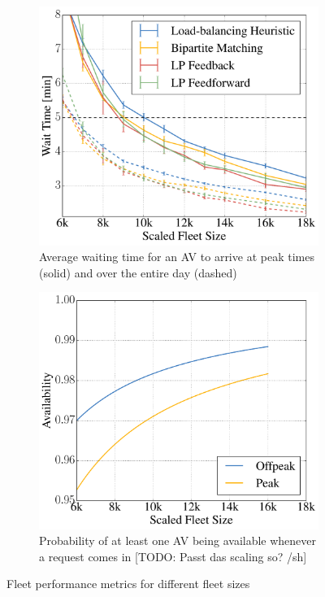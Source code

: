 \begin{figure}
    \centering
    \begin{subfigure}[t]{0.495\textwidth}
        \includegraphics[width=1.0\textwidth]{figures/mean_peak_waiting_times.pdf}
        \caption{Average waiting time for an AV to arrive at peak times (solid) and over the entire day (dashed)}
        \label{fig:mean_peak_waiting_times}
    \end{subfigure}\hfill
    \begin{subfigure}[t]{0.495\textwidth}
        \includegraphics[width=1.0\textwidth]{figures/availability.pdf}
        \caption{Probability of at least one AV being available whenever a request comes in
        [TODO: Passt das scaling so? /sh]}
        \label{fig:performanceavailability}
    \end{subfigure}
    \caption{Fleet performance metrics for different fleet sizes}
\end{figure}

